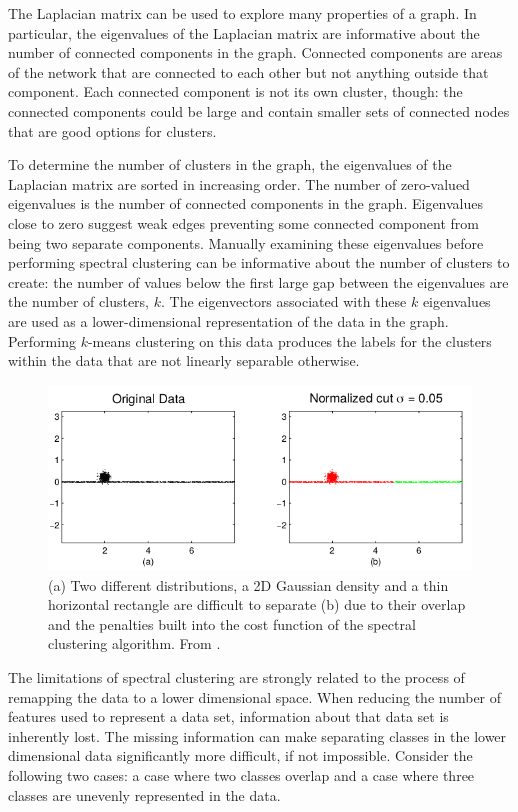 The Laplacian matrix can be used to explore many properties of a graph. In particular, the eigenvalues of the Laplacian matrix are informative about the number of connected components in the graph. Connected components are areas of the network that are connected to each other but not anything outside that component. Each connected component is not its own cluster, though: the connected components could be large and contain smaller sets of connected nodes that are good options for clusters.

To determine the number of clusters in the graph, the eigenvalues of the Laplacian matrix are sorted in increasing order. The number of zero-valued eigenvalues is the number of connected components in the graph. Eigenvalues close to zero suggest weak edges preventing some connected component from being two separate components. Manually examining these eigenvalues before performing spectral clustering can be informative about the number of clusters to create: the number of values below the first large gap between the eigenvalues are the number of clusters, $k$. The eigenvectors associated with these $k$ eigenvalues are used as a lower-dimensional representation of the data in the graph. Performing $k$-means clustering on this data produces the labels for the clusters within the data that are not linearly separable otherwise.

\begin{figure}
\includegraphics[width=.75\textwidth]{4/spectral_clustering_limitation.png}
\caption{(a) Two different distributions, a 2D Gaussian density and a thin horizontal rectangle are difficult to separate (b) due to their overlap and the penalties built into the cost function of the spectral clustering algorithm. From \cite{Nadler2007}.}
\label{ch4:fig:spect-clust-lim-01}
\end{figure}

The limitations of spectral clustering are strongly related to the process of remapping the data to a lower dimensional space.  When reducing the number of features used to represent a data set, information about that data set is inherently lost. The missing information can make separating classes in the lower dimensional data significantly more difficult, if not impossible. Consider the following two cases: a case where two classes overlap and a case where three classes are unevenly represented in the data.

